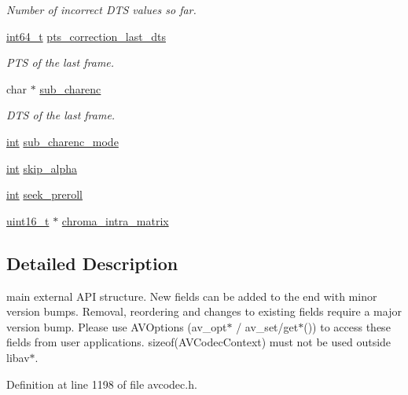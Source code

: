 \begin{DoxyCompactItemize}
\begin{DoxyCompactList}\small\item\em Number of incorrect D\+TS values so far. \end{DoxyCompactList}\item 
\hyperlink{lib-src_2ffmpeg_2win32_2stdint_8h_a67a9885ef4908cb72ce26d75b694386c}{int64\+\_\+t} \hyperlink{struct_a_v_codec_context_a0851bd5a557ed7f8377c491fda568508}{pts\+\_\+correction\+\_\+last\+\_\+dts}
\begin{DoxyCompactList}\small\item\em P\+TS of the last frame. \end{DoxyCompactList}\item 
char $\ast$ \hyperlink{struct_a_v_codec_context_a25710250c5d1319ba14ee7f3112a8aa2}{sub\+\_\+charenc}
\begin{DoxyCompactList}\small\item\em D\+TS of the last frame. \end{DoxyCompactList}\item 
\hyperlink{xmltok_8h_a5a0d4a5641ce434f1d23533f2b2e6653}{int} \hyperlink{struct_a_v_codec_context_a62b675cebedf1e64ca7faecbb23d30a5}{sub\+\_\+charenc\+\_\+mode}
\item 
\hyperlink{xmltok_8h_a5a0d4a5641ce434f1d23533f2b2e6653}{int} \hyperlink{struct_a_v_codec_context_a9fca29999231cacbaf1d4754d9a74997}{skip\+\_\+alpha}
\item 
\hyperlink{xmltok_8h_a5a0d4a5641ce434f1d23533f2b2e6653}{int} \hyperlink{struct_a_v_codec_context_abbde5fb68f6f3dbaa570b37d4769e79f}{seek\+\_\+preroll}
\item 
\hyperlink{lib-src_2ffmpeg_2win32_2stdint_8h_a30af71eaf40c925c9832eb289a48da35}{uint16\+\_\+t} $\ast$ \hyperlink{struct_a_v_codec_context_a0a285528f0f1ad5c9d639f427839e5d3}{chroma\+\_\+intra\+\_\+matrix}
\end{DoxyCompactItemize}


\subsection{Detailed Description}
main external A\+PI structure. New fields can be added to the end with minor version bumps. Removal, reordering and changes to existing fields require a major version bump. Please use A\+V\+Options (av\+\_\+opt$\ast$ / av\+\_\+set/get$\ast$()) to access these fields from user applications. sizeof(\+A\+V\+Codec\+Context) must not be used outside libav$\ast$. 

Definition at line 1198 of file avcodec.\+h.



